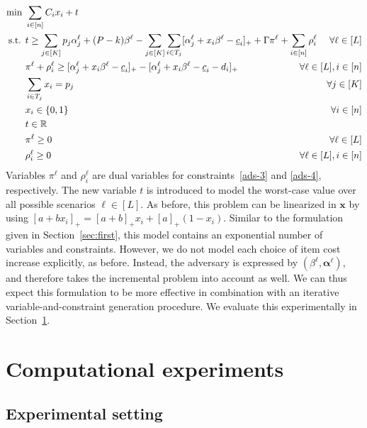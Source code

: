 \documentclass[a4paper,11pt,abstracton]{scrartcl}
\theoremstyle{definition}
\theoremstyle{remark}
\newcommand{\rr}{\mathbb{R}}
\begin{document}
\begin{subequations}
\label{eq:secmod}  
\begin{align}
\min\ & \sum_{i\in[n]} C_i x_i + t \label{secmod-1} \\
\text{s.t. } & t \ge \sum_{j\in[K]} p_j\alpha^{\ell}_j + (P-k)\beta^{\ell} - \sum_{j\in[K]} \sum_{i\in T_j} [\alpha^{\ell}_j + x_i\beta^{\ell} - \underline{c}_i]_+ + \Gamma\pi^{\ell} + \sum_{i\in[n]} \rho^{\ell}_i \hspace*{-10mm}& \forall {\ell}\in[L] \\
& \pi^{\ell} + \rho^{\ell}_i \ge [\alpha^{\ell}_j + x_i\beta^{\ell} - \underline{c}_i]_+ - [\alpha^{\ell}_j + x_i \beta^{\ell} - \underline{c}_i - d_i]_+ & \forall {\ell}\in[L], i\in[n] \\
& \sum_{i\in T_j} x_i = p_j & \forall j\in[K] \\
& x_i \in\{0,1\} & \forall i\in[n] \\
& t \in \rr \\
& \pi^{\ell} \ge 0 & \forall {\ell} \in[L] \\
& \rho^{\ell}_i \ge 0 & \forall {\ell} \in[L],i\in[n] \label{secmod-end}
\end{align}
\end{subequations}
Variables $\pi^{\ell}$ and $\rho^{\ell}_i$ are dual variables for constraints~\eqref{ads-3} and \eqref{ads-4}, respectively. The new variable $t$ is introduced to model the worst-case value over all possible scenarios $\ell \in[L]$. As before, this problem can be linearized in $\pmb{x}$ by using $[a+bx_i]_+ = [a+b]_+ x_i + [a]_+(1-x_i)$. Similar to the formulation given in Section~\ref{sec:first}, this model contains an exponential number of variables and constraints. However, we do not model each choice of item cost increase explicitly, as before. Instead, the adversary is expressed by $(\beta^{\ell},\pmb{\alpha}^{\ell})$, and therefore takes the incremental problem into account as well. We can thus expect this formulation to be more effective in combination with an iterative variable-and-constraint generation procedure. We evaluate this experimentally in Section~\ref{sec:experiments}.





\section{Computational experiments}
\label{sec:experiments}

\subsection{Experimental setting}
\end{document}
